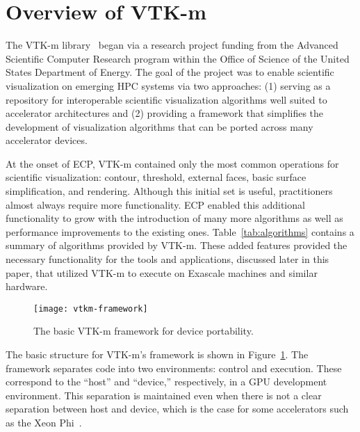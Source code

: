 \section{Overview of VTK-m}


The VTK-m library~\cite{Moreland2016} began via a research project funding
from the 
Advanced Scientific Computer Research program within the Office of Science of the
United States Department of Energy.
The goal of the project was to enable scientific visualization on emerging HPC systems via
two approaches:
(1) serving as a repository for interoperable scientific visualization algorithms well suited to accelerator architectures and (2) providing a framework that simplifies the development of visualization algorithms that can be ported across many accelerator devices.



At the onset of ECP, VTK-m contained only the most common operations for scientific visualization: contour, threshold, external faces, basic surface simplification, and rendering.
Although this initial set is useful, practitioners almost always require more functionality.
ECP enabled this additional functionality to grow with the introduction of many more algorithms as well as performance improvements to the existing ones.
Table~\ref{tab:algorithms} contains a summary of algorithms provided by VTK-m.
These added features provided the necessary functionality for the tools and applications, discussed later in this paper, that utilized VTK-m to execute on Exascale machines and similar hardware.

\begin{figure}[htb]
  \texttt{[image: vtkm-framework]}
  \caption{The basic VTK-m framework for device portability. }
  \label{fig:vtkm-framework}
\end{figure}

The basic structure for VTK-m's framework is shown in Figure~\ref{fig:vtkm-framework}.
The framework separates code into two environments: control and execution.
These correspond to the ``host'' and ``device,'' respectively, in a GPU development environment.
This separation is maintained even when 
there is not a clear separation between host and device, which is the case for some accelerators such as the Xeon Phi~\cite{Jeffers2016}.


